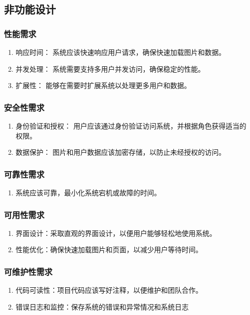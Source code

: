 \documentclass[UTF8]{ctexart}
\begin{document}
\newpage
\subsection{非功能设计}
\subsubsection{性能需求}
\begin{enumerate}
  \item 响应时间： 系统应该快速响应用户请求，确保快速加载图片和数据。
  \item 并发处理： 系统需要支持多用户并发访问，确保稳定的性能。
  \item 扩展性： 能够在需要时扩展系统以处理更多用户和数据。
\end{enumerate}

\subsubsection{安全性需求}
\begin{enumerate}
  \item 身份验证和授权： 用户应该通过身份验证访问系统，并根据角色获得适当的权限。
  \item 数据保护： 图片和用户数据应该加密存储，以防止未经授权的访问。
\end{enumerate}

\subsubsection{可靠性需求}
\begin{enumerate}
  \item 系统应该可靠，最小化系统宕机或故障的时间。
\end{enumerate}

\subsubsection{可用性需求}
\begin{enumerate}
  \item 界面设计：采取直观的界面设计，以便用户能够轻松地使用系统。
  \item 性能优化：确保快速加载图片和页面，以减少用户等待时间。 
\end{enumerate}

\subsubsection{可维护性需求}
\begin{enumerate}
  \item 代码可读性：项目代码应该写好注释，以便维护和团队合作。
  \item 错误日志和监控：保存系统的错误和异常情况和系统日志
\end{enumerate}
\end{document}
